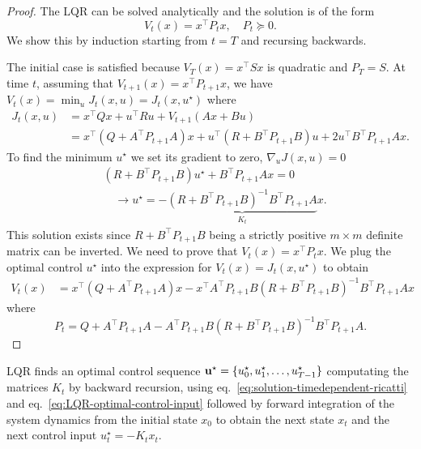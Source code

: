 \begin{proof}
  The LQR can be solved analytically and the solution is of the form
  \begin{equation}
    \label{eq:LQR-generic-solution}
    V_t(x) = x^\top P_tx,\quad P_t\succeq 0.
  \end{equation}
  We show this by induction starting from $t=T$ and recursing backwards.

  The initial case is satisfied because $V_T(x) = x^\top Sx$ is quadratic and $P_T = S$. At time $t$, assuming that $V_{t+1}(x) = x^\top P_{t+1} x$, we have $V_t(x) = \min_u J_t(x,u) = J_t(x,u^\star)$ where
  \begin{align*}
    J_t(x,u) &= x^\top Qx + u^\top Ru + V_{t+1}(Ax+Bu) \\
             &= x^\top\left(Q + A^\top P_{t+1}A\right) x + u^\top\left(R + B^\top P_{t+1}B\right) u + 2u^\top B^\top P_{t+1}Ax.
  \end{align*}
  To find the minimum $u^\star$ we set its gradient to zero, $\nabla_{u} J(x,u) = 0$
  \begin{align}
    &\left(R + B^\top P_{t+1}B\right)u^\star + B^\top P_{t+1}A x = 0 \nonumber \\
    \label{eq:LQR-optimal-control-input}
    &\quad \rightarrow u^\star = -\underbrace{(R+B^\top P_{t+1}B)^{-1}B^\top P_{t+1}A}_{K_t}x.
  \end{align}
  This solution exists since $R+B^\top P_{t+1}B$ being a strictly positive $m\times m$ definite matrix can be inverted. We need to prove that $V_t(x)= x^\top P_t x$. We plug the optimal control $u^\star$ into the expression for $V_t(x)=J_t(x,u^\star)$ to obtain
  \begin{align*}
    V_t(x) &= x^\top \left(Q + A^\top P_{t+1}A\right) x - x^\top A^\top P_{t+1}B\left(R+B^\top P_{t+1}B\right)^{-1}B^\top P_{t+1}Ax
  \end{align*}
  where
  \begin{equation}
    \label{eq:solution-timedependent-ricatti}
    P_t = Q + A^\top P_{t+1}A - A^\top P_{t+1}B\left(R+B^\top P_{t+1}B\right)^{-1}B^\top P_{t+1}A.
  \end{equation}
\end{proof}

LQR finds an optimal control sequence $\boldsymbol{\mathrm{u}}^\star = \{u_0^\star, u_1^\star,\ldots,u_{T-1}^\star\}$ computating the matrices $K_t$ by backward recursion, using eq.~\eqref{eq:solution-timedependent-ricatti} and eq.~\eqref{eq:LQR-optimal-control-input} followed by forward integration of the system dynamics from the initial state $x_0$ to obtain the next state $x_t$ and the next control input $u_t^\star = -K_tx_t$.

